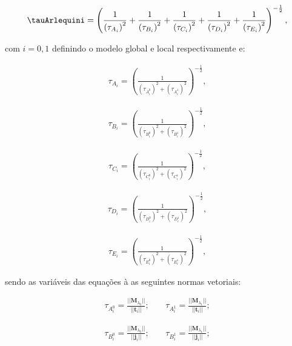\begin{align}
	\tauArlequini = \left(\frac{1}{\left(\tau_{A_i}\right)^{2}} + \frac{1}{\left(\tau_{B_i}\right)^{2}} +  \frac{1}{\left(\tau_{C_i}\right)^{2}} + 
	\frac{1}{\left(\tau_{D_i}\right)^{2}} +
	\frac{1}{\left(\tau_{E_i}\right)^{2}}
	\right)^{-\frac{1}{2}},
\end{align}

\noindent com $i=0,1$ definindo o modelo global e local respectivamente e:

\begin{align}
	\tau_{A_{i}} = \left(\frac{1}{\left(\tau_{A_i^{0}}\right)^{2} + \left(\tau_{A_i^{1}}\right)^{2}} \right)^{-\frac{1}{2}}, \label{eq:tAi}
\end{align}

\begin{align}
	\tau_{B_{i}} = \left(\frac{1}{\left(\tau_{B_i^{0}}\right)^{2} + \left(\tau_{B_i^{1}}\right)^{2}} \right)^{-\frac{1}{2}},
\end{align}

\begin{align}
	\tau_{C_{i}} = \left(\frac{1}{\left(\tau_{C_i^{0}}\right)^{2} + \left(\tau_{C_i^{1}}\right)^{2}} \right)^{-\frac{1}{2}},
\end{align}

\begin{align}
	\tau_{D_{i}} = \left(\frac{1}{\left(\tau_{D_i^{0}}\right)^{2} + \left(\tau_{D_i^{1}}\right)^{2}} \right)^{-\frac{1}{2}},
\end{align}

\begin{align}
	\tau_{E_{i}} = \left(\frac{1}{\left(\tau_{E_i^{0}}\right)^{2} + \left(\tau_{E_i^{1}}\right)^{2}} \right)^{-\frac{1}{2}},\label{eq:tEi}
\end{align}

\noindent sendo as variáveis das equações  à  as seguintes normas vetoriais:

\begin{align}
	\tau_{A_i^{0}} = \frac{|| \mathbf{M}_{\lambda_0} || }{||\mathbf{t}_{i} ||}; \ \ \ \ \  & \tau_{A_i^{1}} = \frac{|| \mathbf{M}_{\lambda_1} || }{||\mathbf{t}_{i} ||};
\end{align}

\begin{align}
	\tau_{B_i^{0}} = \frac{|| \mathbf{M}_{\lambda_0} || }{||\mathbf{j}_{i} ||}; \ \ \ \ \  &  \tau_{B_i^{1}} = \frac{|| \mathbf{M}_{\lambda_1} || }{||\mathbf{j}_{i} ||}; 
\end{align}

